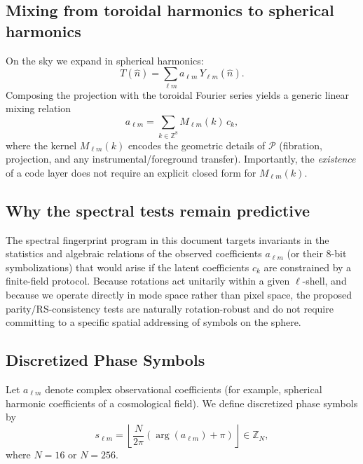 \documentclass[11pt]{article}
\begin{document}
\subsection{Mixing from toroidal harmonics to spherical harmonics}
On the sky we expand in spherical harmonics:
\begin{equation}
  T(\hat n) = \sum_{\ell m} a_{\ell m}\, Y_{\ell m}(\hat n).
\end{equation}
Composing the projection with the toroidal Fourier series yields a generic linear mixing relation
\begin{equation}
  a_{\ell m} = \sum_{k\in\mathbb{Z}^8} M_{\ell m}(k)\, c_k,
  \label{eq:alm_mixing}
\end{equation}
where the kernel $M_{\ell m}(k)$ encodes the geometric details of $\mathcal{P}$ (fibration, projection, and any
instrumental/foreground transfer). Importantly, the \emph{existence} of a code layer does not require an explicit closed
form for $M_{\ell m}(k)$.

\subsection{Why the spectral tests remain predictive}
The spectral fingerprint program in this document targets invariants in the statistics and algebraic relations of
the observed coefficients $a_{\ell m}$ (or their 8-bit symbolizations) that would arise if the latent coefficients
$c_k$ are constrained by a finite-field protocol. Because rotations act unitarily within a given $\ell$-shell, and because
we operate directly in mode space rather than pixel space, the proposed parity/RS-consistency tests are naturally
rotation-robust and do not require committing to a specific spatial addressing of symbols on the sphere.




\subsection{Discretized Phase Symbols}

Let $a_{\ell m}$ denote complex observational coefficients (for example,
spherical harmonic coefficients of a cosmological field). We define
discretized phase symbols by
\begin{equation}
s_{\ell m} =
\left\lfloor
\frac{N}{2\pi}\left(\arg(a_{\ell m})+\pi\right)
\right\rfloor
\in \mathbb{Z}_N,
\end{equation}
where $N=16$ or $N=256$.
\end{document}
